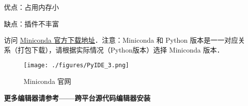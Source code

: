优点：占用内存小

缺点：插件不丰富

访问 \href{https://docs.conda.io/en/latest/miniconda.html#}{Miniconda 官方下载地址}．注意：Miniconda 和 Python 版本是一一对应关系（打包下载），请根据实际情况（Python版本）选择 Miniconda 版本．

\begin{figure}[ht]
\centering
\texttt{[image: ./figures/PyIDE\_3.png]}
\caption{Miniconda 官网} \label{PyIDE_fig3}
\end{figure}

\textbf{更多编辑器请参考——跨平台源代码编辑器安装}

